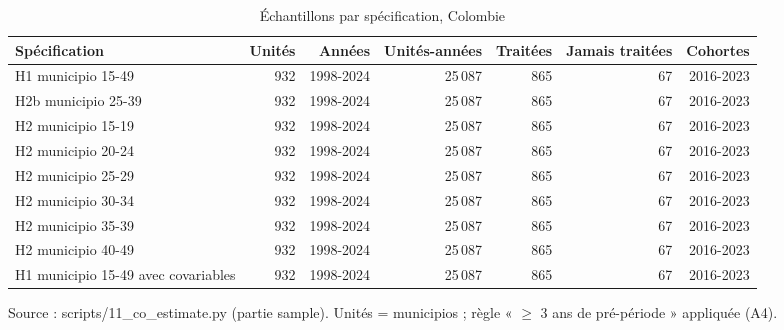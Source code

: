 \begin{table}[htbp]\centering
\begin{threeparttable}
\caption{Échantillons par spécification, Colombie}\label{tab:co_sample}
\footnotesize
\begin{tabular}{p{4.3cm}rrrrrr}
\toprule
Spécification & Unités & Années & Unités-années & Traitées & Jamais traitées & Cohortes \\
\midrule
H1 municipio 15-49 & 932 & 1998-2024 & 25\,087 & 865 & 67 & 2016-2023 \\
H2b municipio 25-39 & 932 & 1998-2024 & 25\,087 & 865 & 67 & 2016-2023 \\
H2 municipio 15-19 & 932 & 1998-2024 & 25\,087 & 865 & 67 & 2016-2023 \\
H2 municipio 20-24 & 932 & 1998-2024 & 25\,087 & 865 & 67 & 2016-2023 \\
H2 municipio 25-29 & 932 & 1998-2024 & 25\,087 & 865 & 67 & 2016-2023 \\
H2 municipio 30-34 & 932 & 1998-2024 & 25\,087 & 865 & 67 & 2016-2023 \\
H2 municipio 35-39 & 932 & 1998-2024 & 25\,087 & 865 & 67 & 2016-2023 \\
H2 municipio 40-49 & 932 & 1998-2024 & 25\,087 & 865 & 67 & 2016-2023 \\
H1 municipio 15-49 avec covariables & 932 & 1998-2024 & 25\,087 & 865 & 67 & 2016-2023 \\
\bottomrule
\end{tabular}
\begin{tablenotes}\footnotesize
\item Source : scripts/11\_co\_estimate.py (partie sample). Unités = municipios ; règle « $\geq$ 3 ans de pré-période » appliquée (A4).
\end{tablenotes}
\end{threeparttable}
\end{table}
